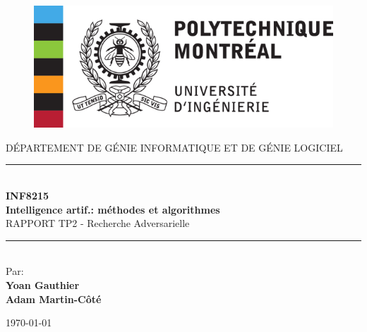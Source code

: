 \begin{titlepage}

\newcommand{\HRule}{\rule{\linewidth}{0.5mm}}
\center 

\begin{figure}[h]
    \includegraphics[scale=1,center]{poly.png}
\end{figure}

\small{DÉPARTEMENT DE GÉNIE INFORMATIQUE ET DE GÉNIE LOGICIEL} \\[2cm]

\HRule \\[0.5cm]
\huge{\bfseries INF8215}\\
\huge{\bfseries Intelligence artif.: méthodes et algorithmes}\\[0.3cm]
\large{RAPPORT TP2 - Recherche Adversarielle}\\[0.2cm]
\HRule \\[1.8cm]
 
Par:\\
  \large \textbf{Yoan Gauthier}\\
  \large \textbf{Adam Martin-Côté}
\vfill 

\today

\end{titlepage}
